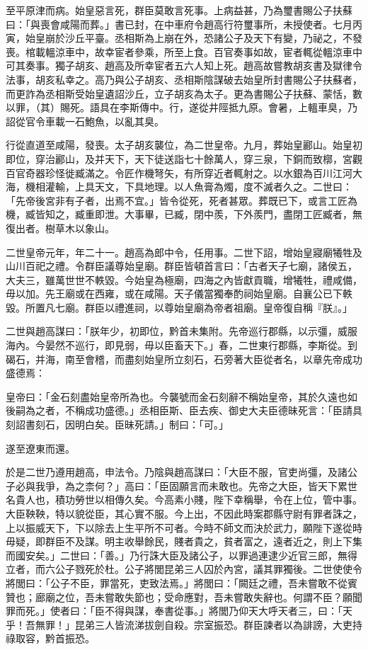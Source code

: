 \begin{pinyinscope}
至平原津而病。始皇惡言死，群臣莫敢言死事。上病益甚，乃為璽書賜公子扶蘇曰：「與喪會咸陽而葬。」書已封，在中車府令趙高行符璽事所，未授使者。七月丙寅，始皇崩於沙丘平臺。丞相斯為上崩在外，恐諸公子及天下有變，乃祕之，不發喪。棺載轀涼車中，故幸宦者參乘，所至上食。百官奏事如故，宦者輒從轀涼車中可其奏事。獨子胡亥、趙高及所幸宦者五六人知上死。趙高故嘗教胡亥書及獄律令法事，胡亥私幸之。高乃與公子胡亥、丞相斯陰謀破去始皇所封書賜公子扶蘇者，而更詐為丞相斯受始皇遺詔沙丘，立子胡亥為太子。更為書賜公子扶蘇、蒙恬，數以罪，（其）賜死。語具在李斯傳中。行，遂從井陘抵九原。會暑，上轀車臭，乃詔從官令車載一石鮑魚，以亂其臭。

行從直道至咸陽，發喪。太子胡亥襲位，為二世皇帝。九月，葬始皇酈山。始皇初即位，穿治酈山，及并天下，天下徒送詣七十餘萬人，穿三泉，下銅而致槨，宮觀百官奇器珍怪徙臧滿之。令匠作機弩矢，有所穿近者輒射之。以水銀為百川江河大海，機相灌輸，上具天文，下具地理。以人魚膏為燭，度不滅者久之。二世曰：「先帝後宮非有子者，出焉不宜。」皆令從死，死者甚眾。葬既已下，或言工匠為機，臧皆知之，臧重即泄。大事畢，已臧，閉中羨，下外羨門，盡閉工匠臧者，無復出者。樹草木以象山。

二世皇帝元年，年二十一。趙高為郎中令，任用事。二世下詔，增始皇寢廟犧牲及山川百祀之禮。令群臣議尊始皇廟。群臣皆頓首言曰：「古者天子七廟，諸侯五，大夫三，雖萬世世不軼毀。今始皇為極廟，四海之內皆獻貢職，增犧牲，禮咸備，毋以加。先王廟或在西雍，或在咸陽。天子儀當獨奉酌祠始皇廟。自襄公已下軼毀。所置凡七廟。群臣以禮進祠，以尊始皇廟為帝者祖廟。皇帝復自稱『朕』。」

二世與趙高謀曰：「朕年少，初即位，黔首未集附。先帝巡行郡縣，以示彊，威服海內。今晏然不巡行，即見弱，毋以臣畜天下。」春，二世東行郡縣，李斯從。到碣石，并海，南至會稽，而盡刻始皇所立刻石，石旁著大臣從者名，以章先帝成功盛德焉：

皇帝曰：「金石刻盡始皇帝所為也。今襲號而金石刻辭不稱始皇帝，其於久遠也如後嗣為之者，不稱成功盛德。」丞相臣斯、臣去疾、御史大夫臣德昧死言：「臣請具刻詔書刻石，因明白矣。臣昧死請。」制曰：「可。」

遂至遼東而還。

於是二世乃遵用趙高，申法令。乃陰與趙高謀曰：「大臣不服，官吏尚彊，及諸公子必與我爭，為之柰何？」高曰：「臣固願言而未敢也。先帝之大臣，皆天下累世名貴人也，積功勞世以相傳久矣。今高素小賤，陛下幸稱舉，令在上位，管中事。大臣鞅鞅，特以貌從臣，其心實不服。今上出，不因此時案郡縣守尉有罪者誅之，上以振威天下，下以除去上生平所不可者。今時不師文而決於武力，願陛下遂從時毋疑，即群臣不及謀。明主收舉餘民，賤者貴之，貧者富之，遠者近之，則上下集而國安矣。」二世曰：「善。」乃行誅大臣及諸公子，以罪過連逮少近官三郎，無得立者，而六公子戮死於杜。公子將閭昆弟三人囚於內宮，議其罪獨後。二世使使令將閭曰：「公子不臣，罪當死，吏致法焉。」將閭曰：「闕廷之禮，吾未嘗敢不從賓贊也；廊廟之位，吾未嘗敢失節也；受命應對，吾未嘗敢失辭也。何謂不臣？願聞罪而死。」使者曰：「臣不得與謀，奉書從事。」將閭乃仰天大呼天者三，曰：「天乎！吾無罪！」昆弟三人皆流涕拔劍自殺。宗室振恐。群臣諫者以為誹謗，大吏持祿取容，黔首振恐。


\end{pinyinscope}
